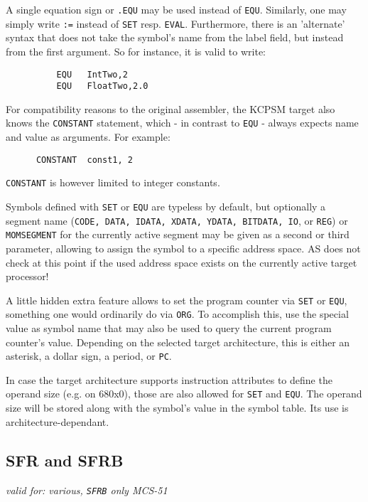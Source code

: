 \documentclass[12pt,twoside]{report}
\makeatletter
\newcommand{\tty}[1]{{\tt #1}}
\newcommand{\ttindex}[1]{\index{#1@{\tt #1}}}
\newcommand{\asname}{{AS}}
\makeatother
\begin{document}
A single equation sign or \tty{.EQU} may be used instead of \tty{EQU}.
Similarly, one may simply write \tty{:=} instead of \tty{SET} resp.
\tty{EVAL}. Furthermore, there is an 'alternate' syntax that does not
take the symbol's name from the label field, but instead from the
first argument.  So for instance, it is valid to write:
\begin{verbatim}
          EQU   IntTwo,2
          EQU   FloatTwo,2.0
\end{verbatim}

For compatibility reasons to the original assembler, the KCPSM target also
knows the {\tt CONSTANT} statement, which - in contrast to \tty{EQU} -
always expects name and value as arguments.  For example:
\begin{verbatim}
      CONSTANT  const1, 2
\end{verbatim}
{\tt CONSTANT} is however limited to integer constants.

Symbols defined with \tty{SET} or \tty{EQU} are typeless by default, but
optionally a segment name (\tty{CODE, DATA, IDATA, XDATA, YDATA, BITDATA,
IO}, or \tty{REG}) or \tty{MOMSEGMENT} for the currently active segment
may be given as a second or third parameter, allowing to assign the symbol to a
specific address space.  \asname{} does not check at this point if the used
address space exists on the currently active target processor!

A little hidden extra feature allows to set the program counter via
\tty{SET} or \tty{EQU}, something one would ordinarily do via \tty{ORG}.
To accomplish this, use the special value as symbol name that may also
be used to query the current program counter's value.  Depending on the
selected target architecture, this is either an asterisk, a dollar sign,
a period, or \tty{PC}.

In case the target architecture supports instruction attributes to define
the operand size (e.g. on 680x0), those are also allowed for \tty{SET} and
\tty{EQU}.  The operand size will be stored along with the symbol's value in
the symbol table.  Its use is architecture-dependant.


\subsection{SFR and SFRB}
\ttindex{SFR}\ttindex{SFRB}

{\em valid for: various, \tty{SFRB} only MCS-51}
\end{document}
